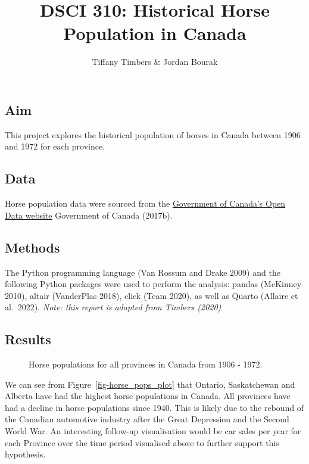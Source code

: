 \documentclass[
  letterpaper,
  DIV=11,
  numbers=noendperiod]{scrartcl}
\title{DSCI 310: Historical Horse Population in Canada}
\author{Tiffany Timbers \& Jordan Bourak}
\date{}
\renewcommand*\contentsname{Table of contents}
\newcommand\contentsname{Table of contents}
\begin{document}
\maketitle

\renewcommand*\contentsname{Table of contents}
{
\hypersetup{linkcolor=}
\setcounter{tocdepth}{2}
\tableofcontents
}
\subsection{Aim}\label{aim}

This project explores the historical population of horses in Canada
between 1906 and 1972 for each province.

\subsection{Data}\label{data}

Horse population data were sourced from the
\href{http://open.canada.ca/en/open-data}{Government of Canada's Open
Data website} Government of Canada (2017b).

\subsection{Methods}\label{methods}

The Python programming language (Van Rossum and Drake 2009) and the
following Python packages were used to perform the analysis: pandas
(McKinney 2010), altair (VanderPlas 2018), click (Team 2020), as well as
Quarto (Allaire et al.~2022). \emph{Note: this report is adapted from
Timbers (2020)}

\subsection{Results}\label{results}

\begin{figure}


\caption{\label{fig-horse\_pops\_plot}Horse populations for all
provinces in Canada from 1906 - 1972.}

\end{figure}%

We can see from Figure~\ref{fig-horse_pops_plot} that Ontario,
Saskatchewan and Alberta have had the highest horse populations in
Canada. All provinces have had a decline in horse populations since
1940. This is likely due to the rebound of the Canadian automotive
industry after the Great Depression and the Second World War. An
interesting follow-up visualisation would be car sales per year for each
Province over the time period visualised above to further support this
hypothesis.
\end{document}
